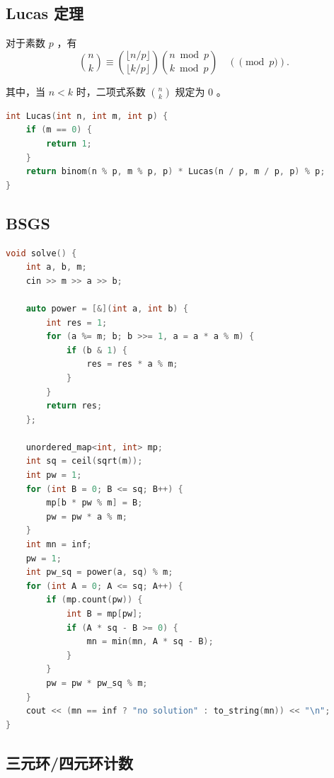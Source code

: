 \subsection{Lucas 定理}
对于素数 $p$ ，有
$$
\binom{n}{k} \equiv\binom{\lfloor n / p\rfloor}{\lfloor k / p\rfloor}\binom{ n \bmod p}{k \bmod p} \quad(\pmod p) .
$$

其中，当 $n<k$ 时，二项式系数 $\binom{n}{k}$ 规定为 0 。

\begin{lstlisting}[language=C++]
int Lucas(int n, int m, int p) {
    if (m == 0) {
        return 1;
    }
    return binom(n % p, m % p, p) * Lucas(n / p, m / p, p) % p;
}
\end{lstlisting}

\subsection{BSGS}

\begin{lstlisting}[language=C++]
void solve() {
    int a, b, m;
    cin >> m >> a >> b;

    auto power = [&](int a, int b) {
        int res = 1;
        for (a %= m; b; b >>= 1, a = a * a % m) {
            if (b & 1) {
                res = res * a % m;
            }
        }
        return res;
    };

    unordered_map<int, int> mp;
    int sq = ceil(sqrt(m));
    int pw = 1;
    for (int B = 0; B <= sq; B++) {
        mp[b * pw % m] = B;
        pw = pw * a % m;
    }
    int mn = inf;
    pw = 1;
    int pw_sq = power(a, sq) % m;
    for (int A = 0; A <= sq; A++) {
        if (mp.count(pw)) {
            int B = mp[pw];
            if (A * sq - B >= 0) {
                mn = min(mn, A * sq - B);
            }
        }
        pw = pw * pw_sq % m;
    }
    cout << (mn == inf ? "no solution" : to_string(mn)) << "\n";
}
\end{lstlisting}

\subsection{三元环/四元环计数}

